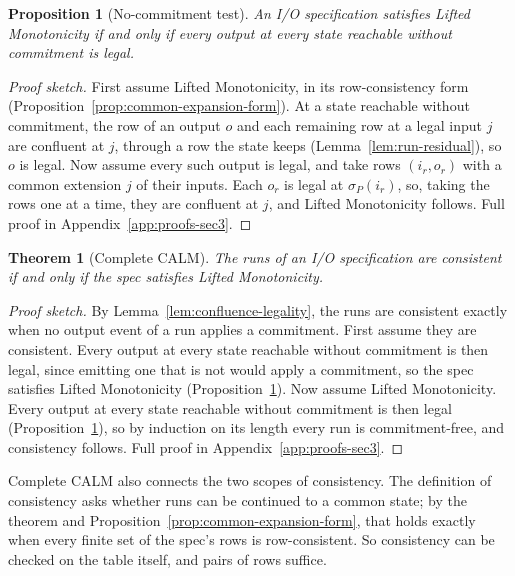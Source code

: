 \documentclass[sigconf]{cidr-2027}
\newtheorem{theorem}{Theorem}
\newtheorem{proposition}{Proposition}
\theoremstyle{remark}
\newcommand{\commitment}{commitment\xspace}
\newcommand{\spectype}[1][]{I/O specification#1\xspace}
\begin{document}
\begin{proposition}[No-\commitment test]
\label{prop:exposure-boundary}
\textcolor{reviewed}{An \spectype satisfies Lifted Monotonicity if and only
if every output at every state reachable without \commitment is legal.}
\end{proposition}

\begin{proof}[Proof sketch]
\textcolor{reviewed}{First assume Lifted Monotonicity, in its row-consistency form
(Proposition~\ref{prop:common-expansion-form}).} \textcolor{reviewed}{At a state reachable without
\commitment, the row of an output $o$ and each remaining row at a legal input $j$ are confluent at $j$, through a row the state keeps
(Lemma~\ref{lem:run-residual}), so $o$ is legal.} \textcolor{reviewed}{Now assume every such output
is legal, and take rows $(i_r,o_r)$ with a common extension $j$ of their inputs.} \textcolor{reviewed}{Each $o_r$ is legal at $\sigma_P(i_r)$, so, taking the rows one at a time, they are confluent at $j$, and Lifted Monotonicity follows.} Full proof in
Appendix~\ref{app:proofs-sec3}.
\end{proof}

\begin{theorem}[Complete CALM]
\label{thm:complete-calm}
\textcolor{reviewed}{The runs of an \spectype are consistent if and only if the spec satisfies
Lifted Monotonicity.}
\end{theorem}

\begin{proof}[Proof sketch]
\textcolor{reviewed}{By Lemma~\ref{lem:confluence-legality}, the runs are consistent exactly when
no output event of a run applies a \commitment.} \textcolor{reviewed}{First assume they are
consistent.} \textcolor{reviewed}{Every output at every state reachable without \commitment is then
legal, since emitting one that is not would apply a \commitment, so the spec
satisfies Lifted Monotonicity (Proposition~\ref{prop:exposure-boundary}).} \textcolor{reviewed}{Now
assume Lifted Monotonicity.} \textcolor{reviewed}{Every output at every state reachable without
\commitment is then legal (Proposition~\ref{prop:exposure-boundary}), so by
induction on its length every run is \commitment-free, and consistency
follows.} Full proof in Appendix~\ref{app:proofs-sec3}.
\end{proof}

Complete CALM also connects the two scopes of consistency. The definition of
consistency asks whether runs can be continued to a common state; by the
theorem and Proposition~\ref{prop:common-expansion-form}, that holds exactly
when every finite set of the spec's rows is row-consistent. So consistency can
be checked on the table itself, and pairs of rows suffice.
\end{document}
